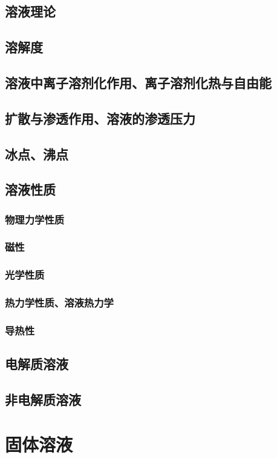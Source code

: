 \documentclass[UTF8]{../03-Chemistry}
\begin{document}
    \subsection{溶液理论}
    \subsection{溶解度}
    \subsection{溶液中离子溶剂化作用、离子溶剂化热与自由能}
    \subsection{扩散与渗透作用、溶液的渗透压力}
    \subsection{冰点、沸点}
    \subsection{溶液性质}
        \subsubsection{物理力学性质}
        \subsubsection{磁性}
        \subsubsection{光学性质}
        \subsubsection{热力学性质、溶液热力学}
        \subsubsection{导热性}
    \subsection{电解质溶液}
    \subsection{非电解质溶液}
\section{固体溶液}
\end{document}
